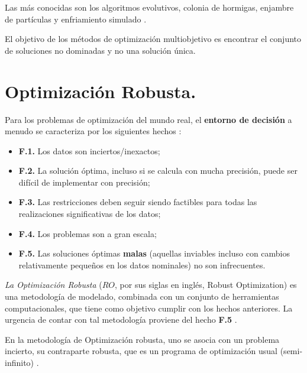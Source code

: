 Las más conocidas son los algoritmos evolutivos, colonia de hormigas, enjambre de partículas y enfriamiento simulado \cite{lima2007}. 

El objetivo de los métodos de optimización multiobjetivo es encontrar el conjunto de soluciones no dominadas y no una solución única.

\section{Optimización Robusta.}
\label{sec:robusta}

Para los problemas de optimización del mundo real, el \textbf{entorno de decisión} a menudo se caracteriza por los siguientes hechos \cite{BenTal2002RobustO}:
\begin{itemize}
    \item \textbf{F.1.} Los datos son inciertos/inexactos;
    \item \textbf{F.2.} La solución óptima, incluso si se calcula con mucha precisión, puede ser difícil de implementar con precisión;
    \item \textbf{F.3.} Las restricciones deben seguir siendo factibles para todas las realizaciones significativas de los datos;
    \item \textbf{F.4.} Los problemas son a gran escala;
    \item \textbf{F.5.} Las soluciones óptimas \textbf{malas} (aquellas inviables incluso con cambios relativamente pequeños en los datos nominales) no son infrecuentes.
 \end{itemize}
 
\textit{La Optimización Robusta} ($RO$, por sus siglas en inglés, Robust Optimization) es una metodología de modelado, combinada con un conjunto de herramientas computacionales, que tiene como objetivo cumplir con los hechos anteriores. La urgencia de contar con tal metodología proviene del hecho \textbf{F.5} \cite{BenTal2002RobustO}.

En la metodología de Optimización robusta, uno se asocia con un problema incierto, su contraparte robusta, que es un programa de optimización usual (semi-infinito) \cite{BenTal2002RobustO}.


